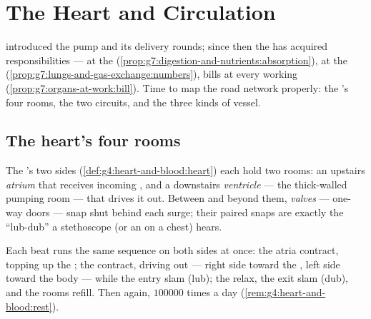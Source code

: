 \chapter{The Heart and Circulation}\label{ch:g7:heart-and-circulation}

 introduced the pump and its
delivery rounds; since then the  has acquired
responsibilities ---  at the 
(\cref{prop:g7:digestion-and-nutrients:absorption}), 
at the 
(\cref{prop:g7:lungs-and-gas-exchange:numbers}), bills at
every working  (\cref{prop:g7:organs-at-work:bill}).
Time to map the road network properly: the 's four
rooms, the two circuits, and the three kinds of vessel.

\section{The heart's four rooms}

\begin{definition}\label{def:g7:heart-and-circulation:rooms}
The 's two sides (\cref{def:g4:heart-and-blood:heart})
each hold two rooms: an upstairs
\emph{atrium} that receives incoming ,
and a downstairs \emph{ventricle} --- the
thick-walled pumping room --- that drives it out. Between
and beyond them, \emph{valves} ---
one-way doors --- snap shut behind each surge; their
paired snaps are exactly the ``lub-dub'' a stethoscope (or
an  on a chest) hears.
\end{definition}

\begin{proposition}\label{prop:g7:heart-and-circulation:beat}
Each beat runs the same sequence on both sides at once:
the atria contract, topping up the ; the
 contract, driving  out --- right side
toward the , left side toward the body --- while the
entry  slam (lub); the  relax, the exit
 slam (dub), and the rooms refill. Then again,
$100000$ times a day
(\cref{rem:g4:heart-and-blood:rest}).
\end{proposition}
\admitted

